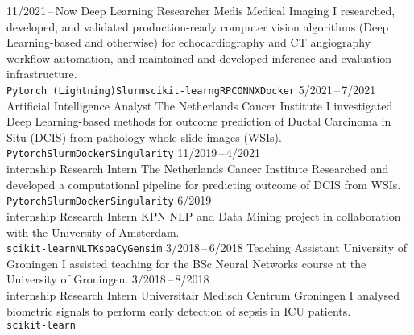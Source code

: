 \documentclass[9pt]{developercv}
\begin{document}
\vspace{.5cm}


\begin{entrylist}
\entry
    {11/2021\,--\,Now}
    {Deep Learning Researcher}
    {Medis Medical Imaging}
    {I researched, developed, and validated production-ready computer vision algorithms (Deep Learning-based and otherwise) for echocardiography and CT angiography workflow automation, and maintained and developed inference and evaluation infrastructure.\\
    \texttt{Pytorch (Lightning)}\slashsepb\texttt{Slurm}\slashsepb\texttt{scikit-learn}\slashsepb\texttt{gRPC}\slashsepb\texttt{ONNX}\slashsepb\texttt{Docker}}
\entry
    {5/2021\,--\,7/2021}
    {Artificial Intelligence Analyst}
    {The Netherlands Cancer Institute}
    {I investigated Deep Learning-based methods for outcome prediction of Ductal Carcinoma in Situ (DCIS) from pathology whole-slide images (WSIs).\\
    \texttt{Pytorch}\slashsepb\texttt{Slurm}\slashsepb\texttt{Docker}\slashsepb\texttt{Singularity}}
\entry
    {11/2019\,--\,4/2021\\\footnotesize{internship}}
    {Research Intern}
    {The Netherlands Cancer Institute}
    {Researched and developed a computational pipeline for predicting outcome of DCIS from WSIs.\\
    \texttt{Pytorch}\slashsepb\texttt{Slurm}\slashsepb\texttt{Docker}\slashsepb\texttt{Singularity}}
\entry
    {6/2019\\\footnotesize{internship}}
    {Research Intern}
    {KPN}
    {NLP and Data Mining project in collaboration with the University of Amsterdam.\\
    \texttt{scikit-learn}\slashsepb\texttt{NLTK}\slashsepb\texttt{spaCy}\slashsepb\texttt{Gensim}}
\entry
    {3/2018\,--\,6/2018}
    {Teaching Assistant}
    {University of Groningen}
    {I assisted teaching for the BSc Neural Networks course at the University of Groningen.}
\entry
    {3/2018\,--\,8/2018\\\footnotesize{internship}}
    {Research Intern}
    {Universitair Medisch Centrum Groningen}
    {I analysed biometric signals to perform early detection of sepsis in ICU patients.\\
    \texttt{scikit-learn}}
\end{entrylist}


\end{document}
